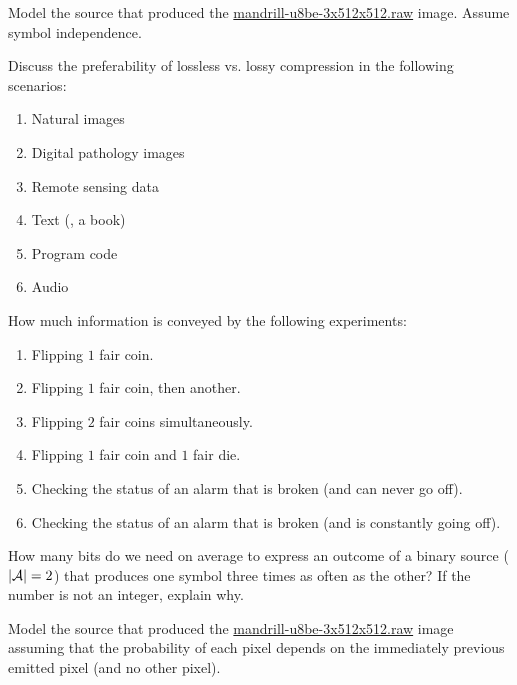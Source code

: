 \begin{exercise}
Model the source that produced the \url{mandrill-u8be-3x512x512.raw} image.
Assume symbol independence.
\end{exercise}

\begin{exercise}
Discuss the preferability of lossless vs. lossy compression in the following \mbox{scenarios}:
\begin{enumerate}
\item Natural images
\item Digital pathology images
\item Remote sensing data
\item Text (\eg, a book)
\item Program code
\item Audio
\end{enumerate}
\end{exercise}

\begin{exercise}
How much information is conveyed by the following experiments:
\begin{enumerate}
\item Flipping $1$ fair coin.
\item Flipping $1$ fair coin, then another.
\item Flipping $2$ fair coins simultaneously.
\item Flipping $1$ fair coin and $1$ fair die.
\item Checking the status of an alarm that is broken (and can never go off).
\item Checking the status of an alarm that is broken (and is constantly going off).
\end{enumerate}
\end{exercise}

\begin{exercise}
How many bits do we need on average to express an outcome of a
binary source ($|\mathcal{A}|=2$) that produces one symbol three times as often as the other?
If the number is not an integer, explain why.
\end{exercise}

\begin{exercise}
Model the source that produced the \url{mandrill-u8be-3x512x512.raw} image
assuming that the probability of each pixel depends on the immediately previous
emitted pixel (and no other pixel).
\end{exercise}
